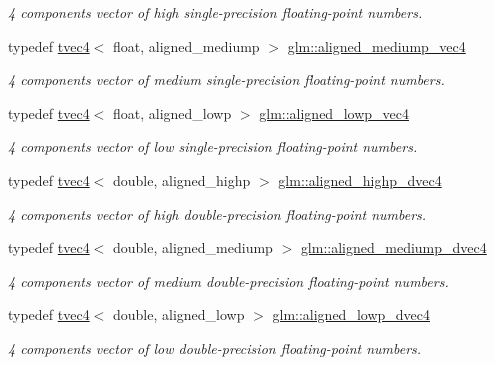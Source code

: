 \begin{DoxyCompactItemize}
\begin{DoxyCompactList}\small\item\em 4 components vector of high single-\/precision floating-\/point numbers. \end{DoxyCompactList}\item 
typedef \mbox{\hyperlink{structglm_1_1tvec4}{tvec4}}$<$ float, aligned\+\_\+mediump $>$ \mbox{\hyperlink{group__gtc__type__aligned_ga4c09f5d9e1a7fa59a9bc9eef1adef368}{glm\+::aligned\+\_\+mediump\+\_\+vec4}}
\begin{DoxyCompactList}\small\item\em 4 components vector of medium single-\/precision floating-\/point numbers. \end{DoxyCompactList}\item 
typedef \mbox{\hyperlink{structglm_1_1tvec4}{tvec4}}$<$ float, aligned\+\_\+lowp $>$ \mbox{\hyperlink{group__gtc__type__aligned_ga6792b3ad721290a69de969d6956c2cef}{glm\+::aligned\+\_\+lowp\+\_\+vec4}}
\begin{DoxyCompactList}\small\item\em 4 components vector of low single-\/precision floating-\/point numbers. \end{DoxyCompactList}\item 
typedef \mbox{\hyperlink{structglm_1_1tvec4}{tvec4}}$<$ double, aligned\+\_\+highp $>$ \mbox{\hyperlink{group__gtc__type__aligned_ga96f78b78823a228d1ca0cfa3be7e6a64}{glm\+::aligned\+\_\+highp\+\_\+dvec4}}
\begin{DoxyCompactList}\small\item\em 4 components vector of high double-\/precision floating-\/point numbers. \end{DoxyCompactList}\item 
typedef \mbox{\hyperlink{structglm_1_1tvec4}{tvec4}}$<$ double, aligned\+\_\+mediump $>$ \mbox{\hyperlink{group__gtc__type__aligned_ga8ba1fb56271d8ffeb78283f0c3426635}{glm\+::aligned\+\_\+mediump\+\_\+dvec4}}
\begin{DoxyCompactList}\small\item\em 4 components vector of medium double-\/precision floating-\/point numbers. \end{DoxyCompactList}\item 
typedef \mbox{\hyperlink{structglm_1_1tvec4}{tvec4}}$<$ double, aligned\+\_\+lowp $>$ \mbox{\hyperlink{group__gtc__type__aligned_ga9fc744c166048040931a89a30f282674}{glm\+::aligned\+\_\+lowp\+\_\+dvec4}}
\begin{DoxyCompactList}\small\item\em 4 components vector of low double-\/precision floating-\/point numbers. \end{DoxyCompactList}\item 

\end{DoxyCompactItemize}
